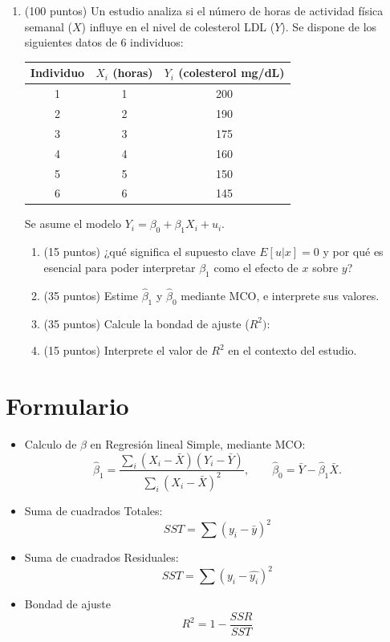 \documentclass[10pt,a4paper]{article}
\begin{document}
 
\begin{enumerate}
    \item (100 puntos)
Un estudio analiza si el número de horas de actividad física semanal ($X$) influye en el nivel de colesterol LDL ($Y$). 
Se dispone de los siguientes datos de 6 individuos:

\begin{center}
\begin{tabular}{|c| c| c|}
\hline
Individuo & $X_i$ (horas) & $Y_i$ (colesterol mg/dL)\\
\hline
1 & 1 & 200\\
2 & 2 & 190\\
3 & 3 & 175\\
4 & 4 & 160\\
5 & 5 & 150\\
6 & 6 & 145\\
\hline
\end{tabular}
\end{center}

Se asume el modelo $Y_i=\beta_0+\beta_1 X_i+u_i$.

\begin{enumerate}
\item (15 puntos) ¿qué significa el supuesto clave $ E[u|x] = 0 $
y por qué es esencial para poder interpretar $\beta_1$ como el efecto de $x$ sobre $y$?

 
\item (35 puntos) Estime $\hat{\beta}_1$ y $\hat{\beta}_0$ mediante MCO, e interprete sus valores.


\item (35 puntos) Calcule la bondad de ajuste ($R^2)$:

\item (15 puntos) Interprete el valor de $R^2$ en el contexto del estudio.

\end{enumerate}




\end{enumerate}


\newpage
\section{Formulario}
\begin{itemize}

\item Calculo de $\beta$ en Regresión lineal Simple, mediante MCO:
\[
\hat{\beta}_1=\frac{\sum_i (X_i-\bar{X})(Y_i-\bar{Y})}{\sum_i (X_i-\bar{X})^2},\qquad
\hat{\beta}_0=\bar{Y}-\hat{\beta}_1\bar{X}.
\]

\item Suma de cuadrados Totales:
$$SST=\sum (y_i-\bar{y})^2$$

\item Suma de cuadrados Residuales:
$$SST=\sum (y_i-\hat{y_i})^2$$

\item Bondad de ajuste
$$R^2 = 1-\frac{SSR}{SST}$$

\end{itemize}
 
\end{document}
